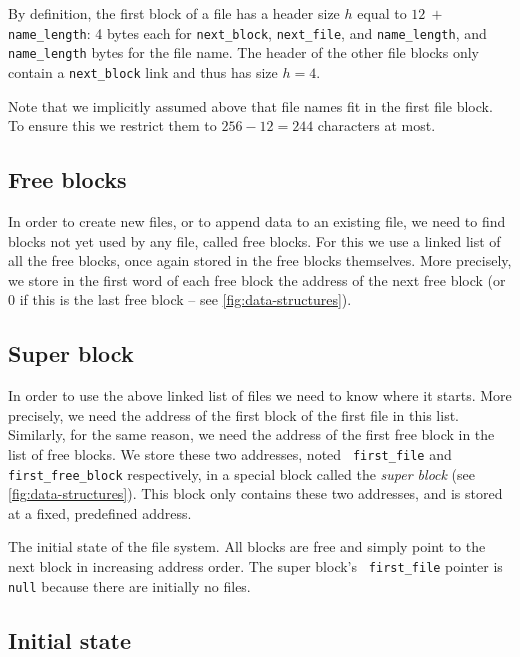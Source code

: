 By definition, the first block of a file has a header size $h$ equal to $12\ +\
${\tt name\_length}: 4 bytes each for {\tt next\_block}, {\tt next\_file}, and
{\tt name\_length}, and {\tt name\_length} bytes for the file name. The header
of the other file blocks only contain a {\tt next\_block} link and thus has
size $h=4$.

Note that we implicitly assumed above that file names fit in the first file
block. To ensure this we restrict them to $256-12=244$ characters at most.

\subsection{Free blocks}

In order to create new files, or to append data to an existing file, we need to
find blocks not yet used by any file, called free blocks. For this we use a
linked list of all the free blocks, once again stored in the free blocks
themselves. More precisely, we store in the first word of each free block the
address of the next free block (or 0 if this is the last free block -- see
\cref{fig:data-structures}).

\subsection{Super block}

In order to use the above linked list of files we need to know where it starts.
More precisely, we need the address of the first block of the first file in
this list. Similarly, for the same reason, we need the address of the first
free block in the list of free blocks. We store these two addresses, noted {\tt
first\_file} and {\tt first\_free\_block} respectively, in a special block
called the {\em super block} (see \cref{fig:data-structures}). This block only
contains these two addresses, and is stored at a fixed, predefined address.

\begin{Figure}
  

  \caption{The initial state of the file system. All blocks are free and simply
  point to the next block in increasing address order. The super block's {\tt
  first\_file} pointer is {\tt null} because there are initially no files.
  }\label{fig:formatted-fs}
\end{Figure}

\subsection{Initial state}

